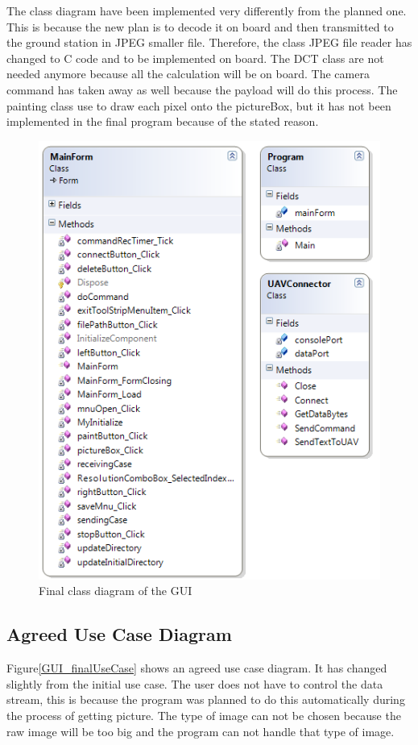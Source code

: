 The class diagram have been implemented very differently from the planned one.
This is because the new plan is to decode it on board and then transmitted to the ground station in JPEG smaller file. 
Therefore, the class JPEG file reader has changed to C code and to be implemented on board. 
The DCT class are not needed anymore because all the calculation will be on board. 
The camera command has taken away as well because the payload will do this  process. 
The painting class use to draw each pixel onto the pictureBox, but it has not been implemented in the final program because of the stated reason.
 
\begin{figure}[!hbtp]
\begin{center}
\includegraphics[scale=0.7]{figures/finalClassDiagram.png} 
\end{center}
\caption{Final class diagram of the GUI\label{GUI_finalClassDiagram}}
\end{figure}
\subsection{Agreed Use Case Diagram}
Figure\ref{GUI_finalUseCase} shows an agreed use case diagram. 
It has changed slightly from the initial use case. 
The user does not have to control the data stream, this is because the program was planned to do this automatically during the process of getting picture. 
The type of image can not be chosen because the raw image will be too big and the program can not handle that type of image.

